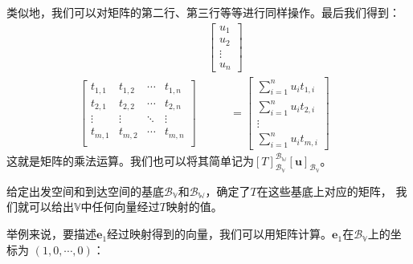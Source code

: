\documentclass[12pt,UTF8]{ctexbook}
\begin{document}
类似地，我们可以对矩阵的第二行、第三行等等进行同样操作。最后我们得到：
\begin{align*}
&  \begin{bmatrix}u_1\\u_2\\ \vdots \\u_n \end{bmatrix} &  \\
    \begin{bmatrix}
        t_{1,1}    & t_{1,2}   & \cdots & t_{1,n} \\
        t_{2,1}    & t_{2,2}   & \cdots & t_{2,n} \\
        \vdots     & \vdots    & \ddots & \vdots  \\
        t_{m,1}    & t_{m,2}   & \cdots & t_{m,n} \\
       \end{bmatrix} \,& \quad\quad = \begin{bmatrix}\sum_{i=1}^n u_i t_{1,i}\\\sum_{i=1}^n u_i t_{2,i}\\ \vdots \\\sum_{i=1}^n u_i t_{m,i} \end{bmatrix} 
\end{align*}
这就是矩阵的乘法运算。我们也可以将其简单记为$[T]_{\mathcal{B}_{\mathbb{V}}}^{\mathcal{B}_{\mathbb{W}}}[\mathbf{u}]_{\mathcal{B}_{\mathbb{V}}}$。

给定出发空间和到达空间的基底$\mathcal{B}_{\mathbb{V}}$和$\mathcal{B}_{\mathbb{W}}$，确定了$T$在这些基底上对应的矩阵，
我们就可以给出$\mathbb{V}$中任何向量经过$T$映射的值。

举例来说，要描述$\mathbf{e}_1$经过映射得到的向量，我们可以用矩阵计算。$\mathbf{e}_1$在$\mathcal{B}_{\mathbb{V}}$上的坐标为
$(1, 0, \cdots, 0)$：
\end{document}
